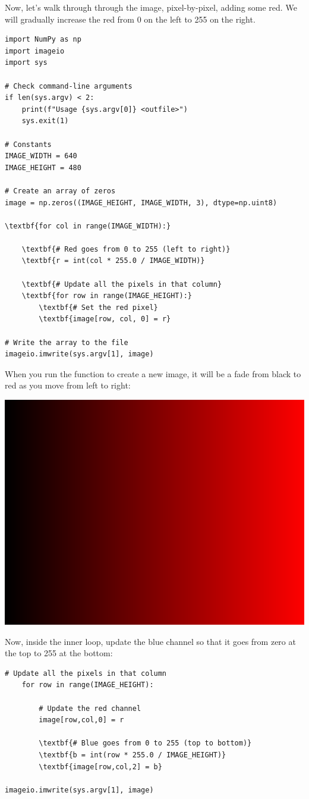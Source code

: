Now, let's walk through through the image, pixel-by-pixel, adding some
red. We will gradually increase the red from 0 on the left to 255 on
the right.

\begin{Verbatim}[commandchars=\\\{\}]
import NumPy as np
import imageio
import sys

# Check command-line arguments
if len(sys.argv) < 2:
    print(f"Usage {sys.argv[0]} <outfile>")
    sys.exit(1)

# Constants
IMAGE_WIDTH = 640
IMAGE_HEIGHT = 480

# Create an array of zeros
image = np.zeros((IMAGE_HEIGHT, IMAGE_WIDTH, 3), dtype=np.uint8)

\textbf{for col in range(IMAGE_WIDTH):}

    \textbf{# Red goes from 0 to 255 (left to right)}
    \textbf{r = int(col * 255.0 / IMAGE_WIDTH)}

    \textbf{# Update all the pixels in that column}
    \textbf{for row in range(IMAGE_HEIGHT):}
        \textbf{# Set the red pixel}
        \textbf{image[row, col, 0] = r}

# Write the array to the file
imageio.imwrite(sys.argv[1], image)
\end{Verbatim}

When you run the function to create a new image, it will be a fade
from black to red as you move from left to right:

\includegraphics[width=0.4\linewidth]{red.png}

Now, inside the inner loop, update the blue channel so that it goes
from zero at the top to 255 at the bottom:

\begin{Verbatim}[commandchars=\\\{\}]
    # Update all the pixels in that column
    for row in range(IMAGE_HEIGHT):

        # Update the red channel
        image[row,col,0] = r
        
        \textbf{# Blue goes from 0 to 255 (top to bottom)}
        \textbf{b = int(row * 255.0 / IMAGE_HEIGHT)}
        \textbf{image[row,col,2] = b}

imageio.imwrite(sys.argv[1], image)
\end{Verbatim}

